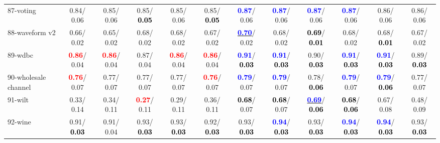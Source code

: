 \begin{table}[h]
\begin{center}
{\begin{tabular}{lc|c|c|c|c|c|c|c|c|c|c}
87-voting &   0.84/  0.06 &   0.85/  0.06 &   0.85/\textcolor{black}{\textbf{  0.05}} &   0.85/  0.06 &   0.85/\textcolor{black}{\textbf{  0.05}} & \textcolor{blue}{\textbf{  0.87}}/  0.06 & \textcolor{blue}{\textbf{  0.87}}/  0.06 & \textcolor{blue}{\textbf{  0.87}}/  0.06 & \textcolor{blue}{\textbf{  0.87}}/  0.06 &   0.86/  0.06 &   0.86/  0.06 \\
88-waveform v2 &   0.66/  0.02 &   0.65/  0.02 &   0.68/  0.02 &   0.68/  0.02 &   0.67/  0.02 & \underline{\textcolor{blue}{\textbf{  0.70}}}/  0.02 &   0.68/  0.02 & \textcolor{black}{\textbf{  0.69}}/\textcolor{black}{\textbf{  0.01}} &   0.68/  0.02 &   0.68/\textcolor{black}{\textbf{  0.01}} &   0.67/  0.02 \\
89-wdbc & \textcolor{red}{\textbf{  0.86}}/  0.04 & \textcolor{red}{\textbf{  0.86}}/  0.04 &   0.87/  0.04 & \textcolor{red}{\textbf{  0.86}}/  0.04 & \textcolor{red}{\textbf{  0.86}}/  0.04 & \textcolor{blue}{\textbf{  0.91}}/\textcolor{black}{\textbf{  0.03}} & \textcolor{blue}{\textbf{  0.91}}/\textcolor{black}{\textbf{  0.03}} &   0.90/\textcolor{black}{\textbf{  0.03}} & \textcolor{blue}{\textbf{  0.91}}/\textcolor{black}{\textbf{  0.03}} & \textcolor{blue}{\textbf{  0.91}}/\textcolor{black}{\textbf{  0.03}} &   0.89/\textcolor{black}{\textbf{  0.03}} \\
90-wholesale channel & \textcolor{red}{\textbf{  0.76}}/  0.07 &   0.77/  0.07 &   0.77/  0.07 &   0.77/  0.07 & \textcolor{red}{\textbf{  0.76}}/  0.07 & \textcolor{blue}{\textbf{  0.79}}/  0.07 & \textcolor{blue}{\textbf{  0.79}}/  0.07 &   0.78/\textcolor{black}{\textbf{  0.06}} & \textcolor{blue}{\textbf{  0.79}}/  0.07 & \textcolor{blue}{\textbf{  0.79}}/\textcolor{black}{\textbf{  0.06}} &   0.77/  0.07 \\
91-wilt &   0.33/  0.14 &   0.34/  0.11 & \textcolor{red}{\textbf{  0.27}}/  0.11 &   0.29/  0.11 &   0.36/  0.11 & \textcolor{black}{\textbf{  0.68}}/  0.07 & \textcolor{black}{\textbf{  0.68}}/  0.07 & \underline{\textcolor{blue}{\textbf{  0.69}}}/\textcolor{black}{\textbf{  0.06}} & \textcolor{black}{\textbf{  0.68}}/\textcolor{black}{\textbf{  0.06}} &   0.67/  0.08 &   0.48/  0.09 \\
92-wine &   0.91/\textcolor{black}{\textbf{  0.03}} &   0.91/  0.04 &   0.93/\textcolor{black}{\textbf{  0.03}} &   0.93/\textcolor{black}{\textbf{  0.03}} &   0.92/\textcolor{black}{\textbf{  0.03}} &   0.93/\textcolor{black}{\textbf{  0.03}} & \textcolor{blue}{\textbf{  0.94}}/\textcolor{black}{\textbf{  0.03}} &   0.93/\textcolor{black}{\textbf{  0.03}} & \textcolor{blue}{\textbf{  0.94}}/\textcolor{black}{\textbf{  0.03}} & \textcolor{blue}{\textbf{  0.94}}/\textcolor{black}{\textbf{  0.03}} &   0.93/\textcolor{black}{\textbf{  0.03}} \\ \hline

\end{tabular}}
\end{center}
\end{table}
